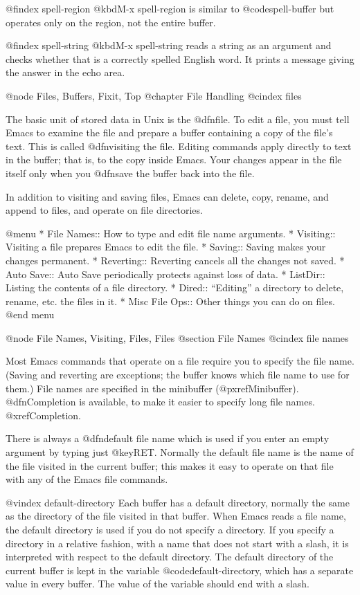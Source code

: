 {{{{{{{{{{{{{{{{@findex spell-region
  @kbd{M-x spell-region} is similar to @code{spell-buffer} but operates
only on the region, not the entire buffer.

@findex spell-string
  @kbd{M-x spell-string} reads a string as an argument and checks
whether that is a correctly spelled English word.  It prints a message
giving the answer in the echo area.

@node Files, Buffers, Fixit, Top
@chapter File Handling
@cindex files

  The basic unit of stored data in Unix is the @dfn{file}.  To edit a file,
you must tell Emacs to examine the file and prepare a buffer containing a
copy of the file's text.  This is called @dfn{visiting} the file.  Editing
commands apply directly to text in the buffer; that is, to the copy inside
Emacs.  Your changes appear in the file itself only when you @dfn{save} the
buffer back into the file.

  In addition to visiting and saving files, Emacs can delete, copy, rename,
and append to files, and operate on file directories.

@menu
* File Names::   How to type and edit file name arguments.
* Visiting::     Visiting a file prepares Emacs to edit the file.
* Saving::       Saving makes your changes permanent.
* Reverting::    Reverting cancels all the changes not saved.
* Auto Save::    Auto Save periodically protects against loss of data.
* ListDir::      Listing the contents of a file directory.
* Dired::        ``Editing'' a directory to delete, rename, etc.
                  the files in it.
* Misc File Ops:: Other things you can do on files.
@end menu

@node File Names, Visiting, Files, Files
@section File Names
@cindex file names

  Most Emacs commands that operate on a file require you to specify the
file name.  (Saving and reverting are exceptions; the buffer knows which
file name to use for them.)  File names are specified in the minibuffer
(@pxref{Minibuffer}).  @dfn{Completion} is available, to make it easier to
specify long file names.  @xref{Completion}.

  There is always a @dfn{default file name} which is used if you
enter an empty argument by typing just @key{RET}.  Normally the default
file name is the name of the file visited in the current buffer; this
makes it easy to operate on that file with any of the Emacs file
commands.

@vindex default-directory
  Each buffer has a default directory, normally the same as the
directory of the file visited in that buffer.  When Emacs reads a file
name, the default directory is used if you do not specify a directory.
If you specify a directory in a relative fashion, with a name that does
not start with a slash, it is interpreted with respect to the default
directory.  The default directory of the current buffer is kept in the
variable @code{default-directory}, which has a separate value in every
buffer.  The value of the variable should end with a slash.

}}}}}}}}}}}}}}}}
